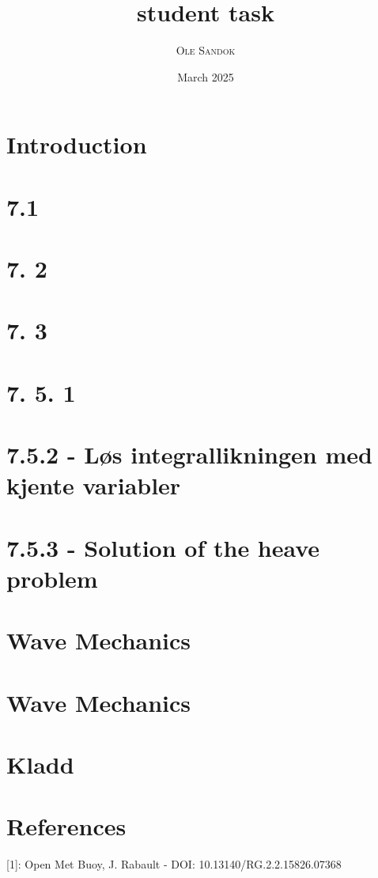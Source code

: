 \documentclass{article}
\title{student task}
\subtitle{\textit{\headcourse}}
\author{\textsc{Ole Sandok}}
\date{March 2025} %
\begin{document}
\maketitle 
\thispagestyle{fancy}

\section{Introduction}

\section{7.1}
%

\section{7. 2}
%

\section{7. 3}
%

\section{7. 5. 1}
%

\section{7.5.2 - Løs integrallikningen med kjente variabler}
%

\section{7.5.3 - Solution of the heave problem}


\section{Wave Mechanics}
%

\section{Wave Mechanics}
%

\section{Kladd}
%

\section{References}
[1]: Open Met Buoy, J. Rabault - DOI: 10.13140/RG.2.2.15826.07368
\end{document}
